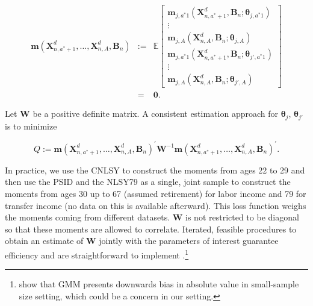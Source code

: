 \begin{eqnarray}
\bm{m} \left( \bm{X}_{n,a^*+1}^d, \ldots,  \bm{X}_{n,A}^d, \bm{B}_{n} \right) &:=& \mathbb{E}
\begin{bmatrix}
\bm{m}_{j,a^*1} \left( \bm{X}_{n,a^*+1}^d, \bm{B}_{n}; \bm{\theta}_{j,a^*1} \right) \\ \vdots \\  \bm{m}_{j,A} \left( \bm{X}_{n,A}^d, \bm{B}_{n}; \bm{\theta}_{j,A} \right) \\ \bm{m}_{j,a^*1} \left( \bm{X}_{n,a^*+1}^d, \bm{B}_{n}; \bm{\theta}_{j',a^*1} \right) \\ \vdots \\  \bm{m}_{j,A} \left( \bm{X}_{n,A}^d, \bm{B}_{n}; \bm{\theta}_{j',A} \right)
\end{bmatrix}  \\ \nonumber
&=& \bm{0}.
\end{eqnarray}

\noindent Let $\bm{W}$ be a positive definite matrix. A consistent estimation approach for $\bm{\theta}_{j}$, $\bm{\theta}_{j'}$ is to minimize 

\begin{equation}
Q :=  {\bm{m} \left( \bm{X}_{n,a^*+1}^d, \ldots,  \bm{X}_{n,A}^d, \bm{B}_{n} \right)}^{'} \bm{W} ^{-1} {\bm{m} \left( \bm{X}_{n,a^*+1}^d, \ldots,  \bm{X}_{n,A}^d, \bm{B}_{n} \right)^{'}}. \label{eq:wloss}
\end{equation}

\noindent In practice, we use the CNLSY to construct the moments from ages 22 to 29 and then use the PSID and the NLSY79 as a single, joint sample to construct the moments from ages 30 up to 67 (assumed retirement) for labor income and 79 for transfer income (no data on this is available afterward). This loss function weighs the moments coming from different datasets. $\bm{W}$ is not restricted to be diagonal so that these moments are allowed to correlate. Iterated, feasible procedures to obtain an estimate of $\bm{W}$ jointly with the parameters of interest guarantee efficiency and are straightforward to implement \citep{Hansen_1982_Econometrica,Amemiya_1985_advanced}.\footnote{\citet{Altonji_Segal_1996_JoBaES} show that GMM presents downwards bias in absolute value in small-sample size setting, which could be a concern in our setting.} 












\singlespace






